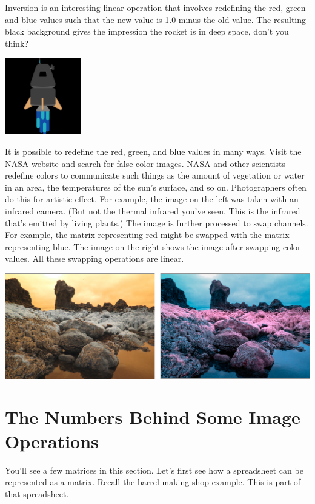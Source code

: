 Inversion is an interesting linear operation that involves redefining the red, green and blue values such that the new value is 1.0 minus the old value. The resulting black background gives the impression the rocket is in deep space, don't you think?

\includegraphics[width=0.25\textwidth]{rocket-inverted.png}

It is possible to redefine the red, green, and blue values in many ways. Visit the NASA website and search for false color images. NASA and other scientists redefine colors to communicate such things as the amount of vegetation or water in an area, the temperatures of the sun's surface, and so on. Photographers often do this for artistic effect. For example, the image on the left was taken with an infrared camera. (But not the thermal infrared you've seen. This is the infrared that's emitted by living plants.) The image is further processed to swap channels. For example, the matrix representing red might be swapped with the matrix representing blue. The image on the right shows the image after swapping color values. All these swapping operations are linear.

\includegraphics[width=1.0\textwidth]{infrared.png}

\section{The Numbers Behind Some Image Operations}

You'll see a few matrices in this section. Let's first see how a spreadsheet can be represented as a matrix. Recall the barrel making shop example. This is part of that spreadsheet. 

